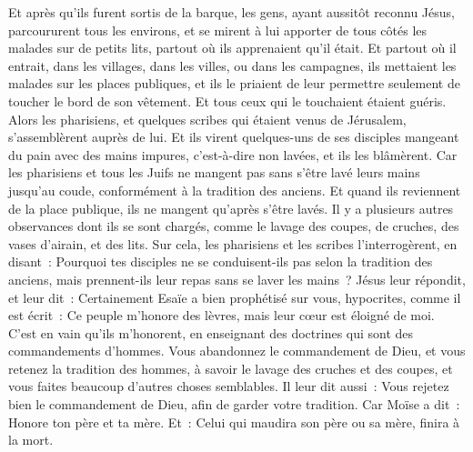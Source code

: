 \begin{multicols}{2}
Et après qu'ils furent sortis de la barque, les gens, ayant aussitôt reconnu Jésus,
parcoururent tous les environs, et se mirent à lui apporter de tous côtés les malades sur de petits lits, partout où ils apprenaient qu'il était.
Et partout où il entrait, dans les villages, dans les villes, ou dans les campagnes, ils mettaient les malades sur les places publiques, et ils le priaient de leur permettre seulement de toucher le bord de son vêtement. Et tous ceux qui le touchaient étaient guéris.
\VerseOne{}Alors les pharisiens, et quelques scribes qui étaient venus de Jérusalem, s'assemblèrent auprès de lui.
Et ils virent quelques-uns de ses disciples mangeant du pain avec des mains impures, c'est-à-dire non lavées, et ils les blâmèrent.
Car les pharisiens et tous les Juifs ne mangent pas sans s'être lavé leurs mains jusqu'au coude, conformément à la tradition des anciens.
Et quand ils reviennent de la place publique, ils ne mangent qu'après s'être lavés. Il y a plusieurs autres observances dont ils se sont chargés, comme le lavage des coupes, de cruches, des vases d'airain, et des lits.
Sur cela, les pharisiens et les scribes l'interrogèrent, en disant~: Pourquoi tes disciples ne se conduisent-ils pas selon la tradition des anciens, mais prennent-ils leur repas sans se laver les mains~?
Jésus leur répondit, et leur dit~: Certainement Esaïe a bien prophétisé sur vous, hypocrites, comme il est écrit~: Ce peuple m'honore des lèvres, mais leur cœur est éloigné de moi.
C'est en vain qu'ils m'honorent, en enseignant des doctrines qui sont des commandements d'hommes.
Vous abandonnez le commandement de Dieu, et vous retenez la tradition des hommes, à savoir le lavage des cruches et des coupes, et vous faites beaucoup d'autres choses semblables.
Il leur dit aussi~: Vous rejetez bien le commandement de Dieu, afin de garder votre tradition.
Car Moïse a dit~: Honore ton père et ta mère. Et~: Celui qui maudira son père ou sa mère, finira à la mort.

\end{multicols}
